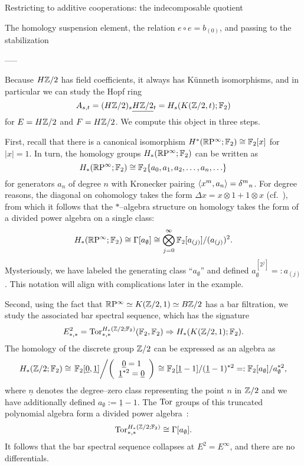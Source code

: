 Restricting to additive cooperations: the indecomposable quotient

The homology suspension element, the relation $e \circ e = b_{(0)}$, and passing to the stabilization



-----

\begin{example}
Because $H\mathbb Z/2$ has field coefficients, it always has K\"unneth isomorphisms, and in particular we can study the Hopf ring \[A_{s, t} = (H\mathbb Z/2)_s \smash{\underline{H\mathbb Z/2}}_{t} = H_s(K(\mathbb Z/2, t); \mathbb F_2)\] for $E = H\mathbb Z/2$ and $F = H\mathbb Z/2$.  We compute this object in three steps.

First, recall that there is a canonical isomorphism $H^*(\mathbb R\mathrm P^\infty; \mathbb F_2) \cong \mathbb F_2[x]$ for $|x| = 1$.  In turn, the homology groups $H_*(\mathbb R\mathrm P^\infty; \mathbb F_2)$ can be written as \[H_*(\mathbb R\mathrm P^\infty; \mathbb F_2) \cong \mathbb F_2\{a_0, a_1, a_2, \ldots, a_n, \ldots\}\] for generators $a_n$ of degree $n$ with Kronecker pairing $\langle x^m, a_n\rangle = \delta{}^m{}_n$.  For degree reasons, the diagonal on cohomology takes the form $\Delta x = x \otimes 1 + 1 \otimes x$ (cf.\ ), from which it follows that the $\ast$--algebra structure on homology takes the form of a divided power algebra on a single class: \[H_*(\mathbb R\mathrm P^\infty; \mathbb F_2) \cong \Gamma[a_\emptyset] \cong \bigotimes_{j=0}^\infty \mathbb F_2[a_{(j)}] / (a_{(j)})^2.\]  Mysteriously, we have labeled the generating class ``$a_\emptyset$'' and defined $a_\emptyset^{[2^j]} =: a_{(j)}$. This notation will align with complications later in the example.

Second, using the fact that $\mathbb R\mathrm P^\infty \simeq K(\mathbb Z/2, 1) \simeq B\mathbb Z/2$ has a bar filtration, we study the associated bar spectral sequence, which has the signature \[E^2_{*, *} = \operatorname{Tor}^{H_*(\mathbb Z/2; \mathbb F_2)}_{*, *}(\mathbb F_2, \mathbb F_2) \Rightarrow H_*(K(\mathbb Z/2, 1); \mathbb F_2).\]  The homology of the discrete group $\mathbb Z/2$ can be expressed as an algebra as
\[
H_*(\mathbb Z/2; \mathbb F_2) \cong \left. \mathbb F_2[\underline 0, \underline 1] \middle/ \left(\begin{array}{c} \underline 0 = 1 \\ \underline 1^{\ast 2} = \underline 0\end{array}\right) \right. \cong \mathbb F_2[\underline 1 - 1] / (\underline 1 - 1)^{\ast 2} =: \mathbb F_2[a_\emptyset] / a_\emptyset^{\ast 2},
\]
where $\underline n$ denotes the degree--zero class representing the point $n$ in $\mathbb Z/2$ and we have additionally defined $a_\emptyset := \underline 1 - 1$.  The $\operatorname{Tor}$ groups of this truncated polynomial algebra form a divided power algebra~\cite{TateResolutions}: \[\operatorname{Tor}^{H_*(\mathbb Z/2; \mathbb F_2)}_{*, *} \cong \Gamma[a_\emptyset].\]  It follows that the bar spectral sequence collapses at $E^2 = E^\infty$, and there are no differentials.


\end{example}
